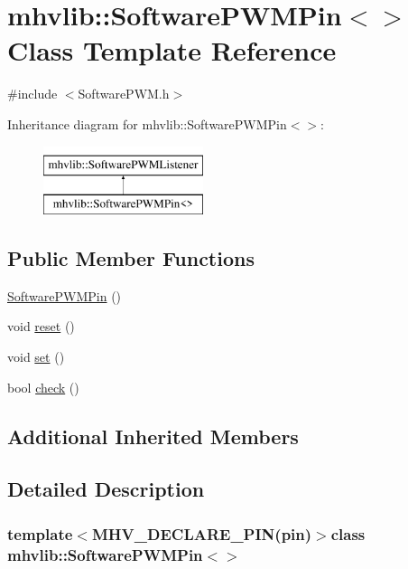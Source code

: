 \hypertarget{classmhvlib_1_1_software_p_w_m_pin}{\section{mhvlib\-:\-:Software\-P\-W\-M\-Pin$<$$>$ Class Template Reference}
\label{classmhvlib_1_1_software_p_w_m_pin}
}


{\ttfamily \#include $<$Software\-P\-W\-M.\-h$>$}

Inheritance diagram for mhvlib\-:\-:Software\-P\-W\-M\-Pin$<$$>$\-:\begin{figure}[H]
\begin{center}
\leavevmode
\includegraphics[height=2.000000cm]{classmhvlib_1_1_software_p_w_m_pin}
\end{center}
\end{figure}
\subsection*{Public Member Functions}
\begin{DoxyCompactItemize}
\item 
\hyperlink{classmhvlib_1_1_software_p_w_m_pin_ac16469df5e4ee0e8707974f6851feed3}{Software\-P\-W\-M\-Pin} ()
\item 
void \hyperlink{classmhvlib_1_1_software_p_w_m_pin_adacacc9cf5726621ba6be7cdd66f6aa8}{reset} ()
\item 
void \hyperlink{classmhvlib_1_1_software_p_w_m_pin_afa4f235d5f03957fd495d4eaa7408935}{set} ()
\item 
bool \hyperlink{classmhvlib_1_1_software_p_w_m_pin_a76f8a71afdedc1c7a7993647141e89cd}{check} ()
\end{DoxyCompactItemize}
\subsection*{Additional Inherited Members}


\subsection{Detailed Description}
\subsubsection*{template$<$M\-H\-V\-\_\-\-D\-E\-C\-L\-A\-R\-E\-\_\-\-P\-I\-N(pin)$>$class mhvlib\-::\-Software\-P\-W\-M\-Pin$<$$>$}



